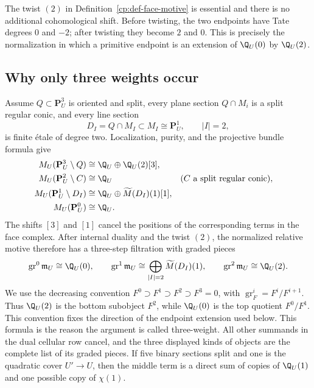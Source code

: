 The twist \((2)\) in Definition~\ref{cp:def-face-motive} is essential and
there is no additional cohomological shift.  Before twisting, the two
endpoints have Tate degrees \(0\) and \(-2\); after twisting they become
\(2\) and \(0\).  This is precisely the normalization in which a primitive
endpoint is an extension of \(\Q_U(0)\) by \(\Q_U(2)\).

\subsection{Why only three weights occur}
\label{cp:subsec-three-weights}

Assume \(Q\subset\mathbf P^3_U\) is oriented and split, every plane section
\(Q\cap M_i\) is a split regular conic, and every line section
\[
 D_I=Q\cap M_I\subset M_I\cong\mathbf P^1_U,
 \qquad |I|=2,
\]
is finite \'etale of degree two.  Localization, purity, and the projective
bundle formula give
\begin{align}
 M_U(\mathbf P^3_U\setminus Q)
   &\cong \Q_U\oplus\Q_U(2)[3],
 \label{cp:eq-open-quadric-motive}\\
 M_U(\mathbf P^2_U\setminus C)
   &\cong \Q_U
   &&(C\text{ a split regular conic}),
 \label{cp:eq-open-conic-motive}\\
 M_U(\mathbf P^1_U\setminus D_I)
   &\cong \Q_U\oplus\widetilde M(D_I)(1)[1],
 \label{cp:eq-punctured-line-motive}\\
 M_U(\mathbf P^0_U)&\cong\Q_U.
 \label{cp:eq-point-motive}
\end{align}
The shifts \([3]\) and \([1]\) cancel the positions of the corresponding
terms in the face complex.  After internal duality and the twist \((2)\), the
normalized relative motive therefore has a three-step filtration with
graded pieces
\begin{equation}
 \operatorname{gr}^0\mathfrak m_U\cong\Q_U(0),
 \qquad
 \operatorname{gr}^1\mathfrak m_U\cong
   \bigoplus_{|I|=2}\widetilde M(D_I)(1),
 \qquad
 \operatorname{gr}^2\mathfrak m_U\cong\Q_U(2).
 \label{cp:eq-dictionary-three-graded-pieces}
\end{equation}
We use the decreasing convention
\(F^0\supset F^1\supset F^2\supset F^3=0\), with
\(\operatorname{gr}_F^i=F^i/F^{i+1}\).  Thus \(\Q_U(2)\) is the bottom
subobject \(F^2\), while \(\Q_U(0)\) is the top quotient
\(F^0/F^1\).  This convention fixes the direction of the endpoint
extension used below.
This formula is the reason the argument is called three-weight.  All other
summands in the dual cellular row cancel, and the three displayed kinds of
objects are the complete list of its graded pieces.  If five binary sections
split and one is the quadratic cover \(U'\to U\), then the middle term is a
direct sum of copies of \(\Q_U(1)\) and one possible copy of \(\chi(1)\).

